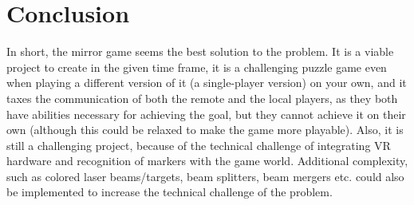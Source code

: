 \chapter{Conclusion} \label{cha:conclusion}
In short, the mirror game seems the best solution to the problem. It is a viable project
to create in the given time frame, it is a challenging puzzle game even when playing a 
different version of it (a single-player version) on your own, and it taxes the communication
of both the remote and the local players, as they both have abilities necessary for
achieving the goal, but they cannot achieve it on their own (although this could be relaxed
to make the game more playable). Also, it is still a challenging project, because of the
technical challenge of integrating VR hardware and recognition of markers with the game
world. Additional complexity, such as colored laser beams/targets, beam splitters, beam mergers
etc. could also be implemented to increase the technical challenge of the problem.
	
